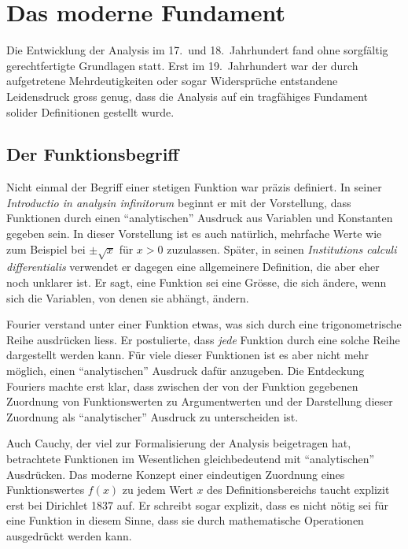 %
%
%
\section{Das moderne Fundament}
Die Entwicklung der Analysis im 17.~und 18.~Jahrhundert fand ohne
sorgfältig gerechtfertigte Grundlagen statt.
Erst im 19.~Jahrhundert war der durch aufgetretene Mehrdeutigkeiten
oder sogar Widersprüche entstandene Leidensdruck gross genug, dass
die Analysis auf ein tragfähiges Fundament solider Definitionen
gestellt wurde.

\subsection{Der Funktionsbegriff
\label{buch:einleitung:fundament:subsection:funktionsbegriff}}
Nicht einmal der Begriff einer stetigen Funktion war präzis definiert.
In seiner \emph{Introductio in analysin infinitorum}
\cite{buch:introductio1,buch:introductio2} beginnt er mit der
Vorstellung, dass Funktionen durch einen ``analytischen'' Ausdruck
aus Variablen und Konstanten gegeben sein.
In dieser Vorstellung ist es auch natürlich, mehrfache Werte 
wie zum Beispiel bei $\pm\!\sqrt{x}$ für $x>0$ zuzulassen.
Später, in seinen \emph{Institutions calculi differentialis}
\cite{buch:institutiones} verwendet er dagegen eine allgemeinere
Definition, die aber eher noch unklarer ist.
Er sagt, eine Funktion sei eine Grösse, die sich ändere, wenn sich die
Variablen, von denen sie abhängt, ändern.

Fourier verstand unter einer Funktion etwas, was sich durch eine
%
trigonometrische Reihe ausdrücken liess.
%
%
Er postulierte, dass \emph{jede} Funktion durch eine solche Reihe
dargestellt werden kann.
Für viele dieser Funktionen ist es aber nicht mehr möglich, einen
``analytischen'' Ausdruck dafür anzugeben.
Die Entdeckung Fouriers machte erst klar, dass zwischen der von der
Funktion gegebenen Zuordnung von Funktionswerten zu Argumentwerten
und der Darstellung dieser Zuordnung als ``analytischer'' Ausdruck
zu unterscheiden ist.

Auch Cauchy, der viel zur Formalisierung der Analysis beigetragen hat,
%
betrachtete Funktionen im Wesentlichen gleichbedeutend mit
``analytischen'' Ausdrücken. 
Das moderne Konzept einer eindeutigen Zuordnung eines Funktionswertes
$f(x)$ zu jedem Wert $x$ des Definitionsbereichs taucht explizit
erst bei Dirichlet 1837 auf.
Er schreibt sogar explizit, dass es nicht nötig sei für eine Funktion
in diesem Sinne, dass sie durch mathematische Operationen ausgedrückt
werden kann.

